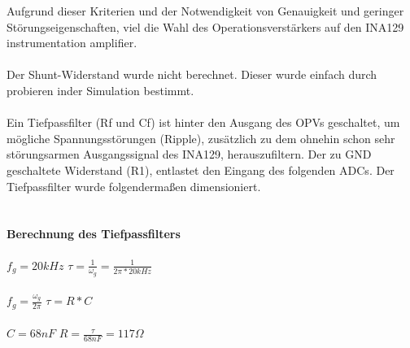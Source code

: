 \documentclass[titlepage,12pt,twoside]{article}
\begin{document}
Aufgrund dieser Kriterien und der Notwendigkeit von Genauigkeit und geringer Störungseigenschaften, viel die Wahl des 
Operationsverstärkers auf den INA129 instrumentation amplifier. \\
\\
Der Shunt-Widerstand wurde nicht berechnet. Dieser wurde einfach durch probieren inder Simulation bestimmt. \\
\\
Ein Tiefpassfilter (Rf und Cf) ist hinter den Ausgang des OPVs geschaltet, um mögliche Spannungsstörungen (Ripple), zusätzlich
zu dem ohnehin schon sehr störungsarmen Ausgangssignal des INA129, herauszufiltern. Der zu GND geschaltete Widerstand (R1), 
entlastet den Eingang des folgenden ADCs. Der Tiefpassfilter wurde folgendermaßen dimensioniert. \\
\\
\paragraph{Berechnung des Tiefpassfilters}
\hfill \break
\hfill \break
\hspace*{1cm} $f_{g} = 20 kHz $ \hspace*{1cm} $\tau = \frac{1}{\omega_{g}} = \frac{1}{2\pi * 20 kHz} $ \\
\\
\hspace*{1cm} $f_{g} = \frac{\omega_{g}}{2\pi} $ \hspace*{1.7cm} $\tau = R * C $ \\
\\
\hspace*{4.25cm} $ C = 68 nF $ \hspace*{1cm} $ R = \frac{\tau}{68nF} = 117 \Omega $ \\
\\
\end{document}
